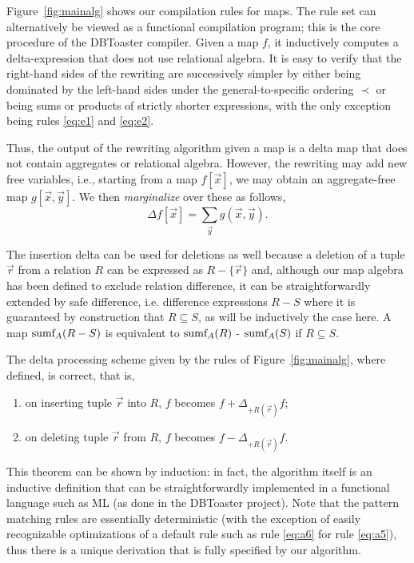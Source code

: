 Figure~\ref{fig:mainalg} shows our compilation rules for maps.
The rule set can alternatively be viewed as a functional compilation program;
this is the core procedure of the DBToaster compiler.
Given a map $f$, it inductively
computes a delta-expression that does not use relational algebra.
It is easy to verify that the right-hand sides of the rewriting are successively
simpler by either being dominated by the left-hand sides under the general-to-specific
ordering $\prec$ or being sums or products of
strictly shorter expressions, with the only exception being rules \ref{eq:e1} and
\ref{eq:e2}.

Thus, the output of the rewriting algorithm given a map is a delta map that does not
contain aggregates or relational algebra. However, the rewriting may add new free
variables, i.e., starting from a map $f[\vec{x}]$, we may obtain an aggregate-free
map $g[\vec{x}, \vec{y}]$. We then {\em marginalize}\/ over these as follows,
\[
\Delta f[\vec{x}] = \sum_{\vec{y}} g(\vec{x}, \vec{y}). 
\]

The insertion delta can be used for deletions as well because a deletion of
a tuple $\vec{r}$ from a relation $R$ can be expressed as $R - \{\vec{r}\}$ and,
although our map algebra has been defined to exclude relation difference,
it can be straightforwardly extended by safe difference, i.e. difference expressions
$R-S$ where it is guaranteed by construction that $R \subseteq S$, as will be inductively the case here. A map $\mbox{sumf}_A(R - S)$ is equivalent to
$\mbox{sumf}_A(R)$ - $\mbox{sumf}_A(S)$ if $R \subseteq S$.



\begin{theorem}
The delta processing scheme given by the rules of Figure~\ref{fig:mainalg},
where defined, is correct, that is,
\begin{enumerate}
\item
on inserting tuple $\vec{r}$ into $R$, $f$ becomes
$f + \Delta_{+R(\vec{r})} f$;

\item
on deleting tuple $\vec{r}$ from $R$, $f$ becomes
$f - \Delta_{+R(\vec{r})} f$.
\end{enumerate}
\end{theorem}


This theorem can be shown by induction: in fact, the algorithm itself is an inductive
definition that can be straightforwardly implemented in a functional language such as
ML (as done in the DBToaster project). Note that the pattern matching rules are
essentially deterministic (with the exception of easily recognizable optimizations of a default rule such as rule \ref{eq:a6} for rule \ref{eq:a5}),
thus there is a unique derivation that is fully specified by our
algorithm.

